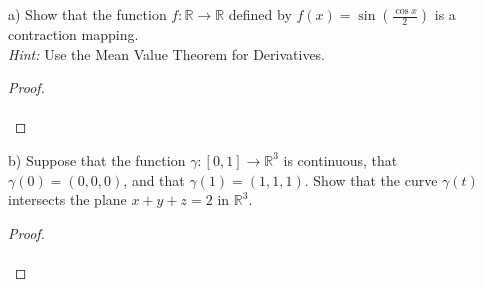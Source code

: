 a) Show that the function $f:\mathbb{R} \to \mathbb{R}$ defined by $f(x) = \sin{(\frac{\cos{x}}{2})}$ is a contraction
   mapping. \ \\

   \emph{Hint:} Use the Mean Value Theorem for Derivatives.
\begin{proof}\renewcommand{\qedsymbol}{}\ \\\\
\end{proof}

\pagebreak

b) Suppose that the function $\gamma:[0, 1] \to \mathbb{R}^3$ is continuous, that $\gamma(0) = (0, 0, 0)$, and that
   $\gamma(1) = (1, 1, 1)$. Show that the curve $\gamma(t)$ intersects the plane $x + y + z = 2$ in $\mathbb{R}^3$.

\begin{proof}\renewcommand{\qedsymbol}{}\ \\\\
\end{proof}
